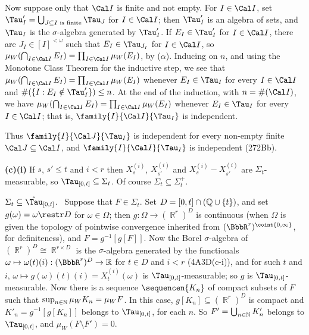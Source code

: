 { Now suppose only that $\Cal I$ is finite and not empty.
For $I\in\Cal I$,
set $\Tau'_I=\bigcup_{J\subseteq I\text{ is finite}}\Tau_J$ for
$I\in\Cal I$;  then $\Tau'_I$ is an algebra of sets, and $\Tau_I$ is the
$\sigma$-algebra generated by $\Tau'_I$.   If $E_I\in\Tau'_I$ for
$I\in\Cal I$, there are $J_I\in[I]^{<\omega}$ such that $E_I\in\Tau_{J_I}$
for $I\in\Cal I$, so
$\mu_W(\bigcap_{I\in\Cal I}E_I)=\prod_{I\in\Cal I}\mu_W(E_I)$, by
($\alpha$).   Inducing on $n$, and using the Monotone Class Theorem
for the inductive step, we see that
$\mu_W(\bigcap_{I\in\Cal I}E_I)=\prod_{I\in\Cal I}\mu_W(E_I)$
whenever $E_I\in\Tau_I$ for every $I\in\Cal I$ and
$\#(\{I:E_I\notin\Tau'_I\})\le n$.   At the end of the induction, with
$n=\#(\Cal I)$, we have
$\mu_W(\bigcap_{I\in\Cal I}E_I)=\prod_{I\in\Cal I}\mu_W(E_I)$
whenever $E_I\in\Tau_I$ for every $I\in\Cal I$;  that is,
$\family{I}{\Cal I}{\Tau_I}$ is independent.

\medskip

 Thus $\family{I}{\Cal J}{\Tau_I}$ is independent for every
non-empty finite $\Cal J\subseteq\Cal I$, and $\family{I}{\Cal I}{\Tau_I}$
is independent (272Bb).

\medskip

{\bf (c)(i)} If $s$, $s'\le t$ and $i<r$
then $X^{(i)}_s$, $X^{(i)}_{s'}$ and $X^{(i)}_s-X^{(i)}_{s'}$ are
$\Sigma_t$-measurable, so $\Tau_{[0,t]}\subseteq\Sigma_t$.
Of course $\Sigma_t\subseteq\Sigma^+_t$.

\medskip

 $\Sigma_t\subseteq\hat\Tau_{[0,t]}$.   \Prf\ Suppose that
$F\in\Sigma_t$.   Set $D=[0,t]\cap(\Bbb Q\cup\{t\})$, and set
$g(\omega)=\omega\restr D$ for $\omega\in\Omega$;  then
$g:\Omega\to(\BbbR^r)^D$ is continuous (when $\Omega$ is given the topology
of pointwise convergence inherited from $(\BbbR^r)^{\coint{0,\infty}}$,
for definiteness), and $F=g^{-1}[g[F]]$.   Now the Borel $\sigma$-algebra
of $(\BbbR^r)^D\cong\BbbR^{r\times D}$ is the $\sigma$-algebra generated
by the functionals $\omega\mapsto\omega(t)(i):(\BbbR^r)^D\to\Bbb R$ for
$t\in D$ and $i<r$ (4A3D(c-i)), and for such $t$ and $i$,
$\omega\mapsto g(\omega)(t)(i)=X_t^{(i)}(\omega)$ is
$\Tau_{[0,t]}$-measurable;  so $g$ is $\Tau_{[0,t]}$-measurable.   Now
there is a sequence $\sequencen{K_n}$ of compact subsets of $F$ such that
$\sup_{n\in\Bbb N}\mu_WK_n=\mu_WF$.    In this case,
$g[K_n]\subseteq(\BbbR^r)^D$ is compact and $K'_n=g^{-1}[g[K_n]]$ belongs
to $\Tau_{[0,t]}$, for each $n$.   So $F'=\bigcup_{n\in\Bbb N}K'_n$ belongs
to $\Tau_{[0,t]}$, and $\mu_W(F\setminus F')=0$.

}
